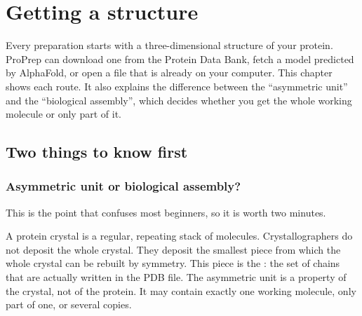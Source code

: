 \chapter{Getting a structure}
\label{ch:structure}

Every preparation starts with a three-dimensional structure of your protein.
ProPrep can download one from the Protein Data Bank, fetch a model predicted
by AlphaFold, or open a file that is already on your computer.
This chapter shows each route. It also explains the difference between the
``asymmetric unit'' and the ``biological assembly'', which decides whether you
get the whole working molecule or only part of it.

\begin{glance}
\end{glance}

\section{Two things to know first}
\label{sec:structure-basics}

\subsection{Asymmetric unit or biological assembly?}
\label{sec:structure-asu}

This is the point that confuses most beginners, so it is worth two minutes.

A protein crystal is a regular, repeating stack of molecules. Crystallographers
do not deposit the whole crystal. They deposit the smallest piece from which the
whole crystal can be rebuilt by symmetry. This piece is the
: the set of chains that are actually written in the PDB
file. The asymmetric unit is a property of the crystal, not of the protein. It
may contain exactly one working molecule, only part of one, or several copies.

